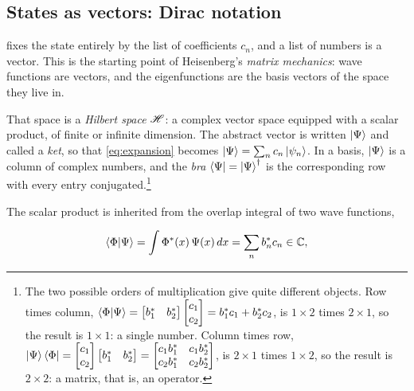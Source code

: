     \subsection{States as vectors: Dirac notation}

         fixes the state entirely by the list of coefficients $c_{n}$, and a list of numbers is a vector. This is the starting point of Heisenberg's \emph{matrix mechanics}: wave functions are vectors, and the eigenfunctions are the basis vectors of the space they live in.

        That space is a \emph{Hilbert space} $\mathscr{H}$: a complex vector space equipped with a scalar product, of finite or infinite dimension. The abstract vector is written $\ket{\Psi}$ and called a \emph{ket}, so that \cref{eq:expansion} becomes $\ket{\Psi} = \sum_{n}c_{n}\ket{\psi_{n}}$. In a basis, $\ket{\Psi}$ is a column of complex numbers, and the \emph{bra} $\bra{\Psi} = \ket{\Psi}^{\dag}$ is the corresponding row with every entry conjugated.\footnote{The two possible orders of multiplication give quite different objects. Row times column, $\braket{\Phi|\Psi} = \begin{bmatrix} b_{1}^{*} & b_{2}^{*} \end{bmatrix}\begin{bmatrix} c_{1} \\ c_{2} \end{bmatrix} = b_{1}^{*}c_{1} + b_{2}^{*}c_{2}$, is $1\times2$ times $2\times1$, so the result is $1\times1$: a single number. Column times row, $\ket{\Psi}\bra{\Phi} = \begin{bmatrix} c_{1} \\ c_{2} \end{bmatrix}\begin{bmatrix} b_{1}^{*} & b_{2}^{*} \end{bmatrix} = \begin{bmatrix} c_{1}b_{1}^{*} & c_{1}b_{2}^{*} \\ c_{2}b_{1}^{*} & c_{2}b_{2}^{*} \end{bmatrix}$, is $2\times1$ times $1\times2$, so the result is $2\times2$: a matrix, that is, an operator.}

        The scalar product is inherited from the overlap integral of two wave functions,

        \begin{equation}\label{eq:inner-product}
            \braket{\Phi|\Psi} = \int \Phi^{*}(x)\,\Psi(x)\,dx = \sum_{n}b_{n}^{*}c_{n} \in \mathbb{C},
        \end{equation}


